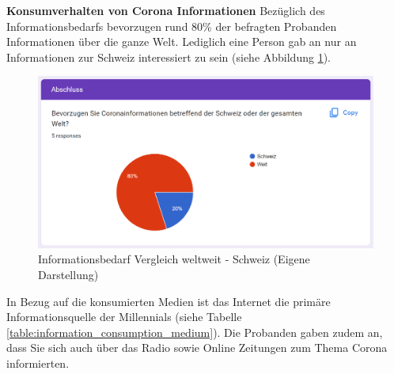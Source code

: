 \noindent
\textbf{Konsumverhalten von Corona Informationen}
\newline
\indent
Bezüglich des Informationsbedarfs bevorzugen rund 80\% der befragten Probanden Informationen über die ganze Welt. Lediglich eine Person gab an nur an Informationen zur Schweiz interessiert zu sein (siehe Abbildung \ref{fig:information_need_worldwide_switzerland}).

\begin{figure}[h]
    \includegraphics[width=14cm]{images/information_need_worldwide_switzerland.png}
    \centering
    \caption{Informationsbedarf Vergleich weltweit - Schweiz (Eigene Darstellung)}
    \label{fig:information_need_worldwide_switzerland}
\end{figure}

\clearpage
In Bezug auf die konsumierten Medien ist das Internet die primäre Informationsquelle der Millennials (siehe Tabelle \ref{table:information_consumption_medium}). Die Probanden gaben zudem an, dass Sie sich auch über das Radio sowie Online Zeitungen zum Thema Corona informierten.

\begin{table}[h]
\centering
{}
\caption{Bevorzugte Medien der Millennials für den Informationskonsum in Bezug auf Corona (Eigene Darstellung)}
\label{table:information_consumption_medium}
\end{table}

